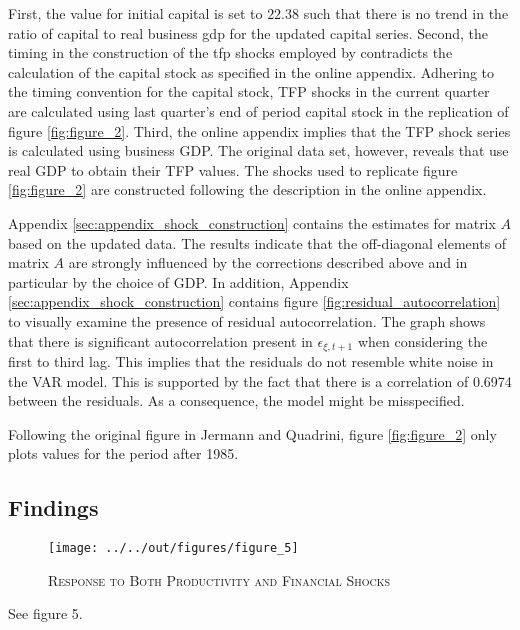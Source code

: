 First, the value for initial capital is set to $22.38$ such that there is no trend in the ratio of capital to real business gdp for the updated capital series. Second, the timing in the construction of the tfp shocks employed by \citeauthor{JERMANNfinancial} contradicts the calculation of the capital stock as specified in the online appendix. Adhering to the timing convention for the capital stock, TFP shocks in the current quarter are calculated using last quarter's end of period capital stock in the replication of figure \ref{fig:figure_2}. 
Third, the online appendix implies that the TFP shock series is calculated using business GDP. The original data set, however, reveals that \citeauthor{JERMANNfinancial} use real GDP to obtain their TFP values. The shocks used to replicate figure \ref{fig:figure_2} are constructed following the description in the online appendix. 

Appendix \ref{sec:appendix_shock_construction} contains the estimates for matrix $A$ based on the updated data. The results indicate that the off-diagonal elements of matrix $A$ are strongly influenced by the corrections described above and in particular by the choice of GDP. 
In addition, Appendix \ref{sec:appendix_shock_construction} contains figure \ref{fig:residual_autocorrelation} to visually examine the presence of residual autocorrelation.
The graph shows that there is significant autocorrelation present in ${\epsilon}_{\xi,t+1}$ when considering the first to third lag. This implies that the residuals do not resemble white noise in the VAR model. This is supported by the fact that there is a correlation of 0.6974 between the residuals. As a consequence, the model might be misspecified.

Following the original figure in Jermann and Quadrini, figure \ref{fig:figure_2} only plots values for the period after 1985.


\subsection{Findings}
\label{sec:findings}

\begin{figure}[t]
    
    \centering

    \texttt{[image: ../../out/figures/figure\_5]}

    \caption{\textsc{Response to Both Productivity and Financial Shocks}}
    
    \label{fig:figure_5}

\end{figure}

See figure 5.